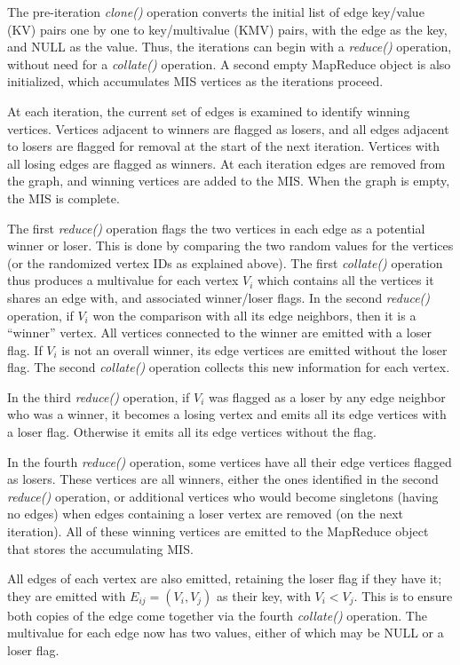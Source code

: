 The pre-iteration {\it clone()} operation converts the initial list of
edge key/value (KV) pairs one by one to key/multivalue (KMV) pairs,
with the edge as the key, and NULL as the value.  Thus, the iterations
can begin with a {\it reduce()} operation, without need for a {\it
collate()} operation.  A second empty MapReduce object is also
initialized, which accumulates MIS vertices as the iterations proceed.

At each iteration, the current set of edges is examined to identify
winning vertices.  Vertices adjacent to winners are flagged as losers,
and all edges adjacent to losers are flagged for removal at the start
of the next iteration.  Vertices with all losing edges are flagged as
winners.  At each iteration edges are removed from the graph, and
winning vertices are added to the MIS.  When the graph is empty, the
MIS is complete.

The first {\it reduce()} operation flags the two vertices in each edge as a
potential winner or loser.  This is done by comparing the two random
values for the vertices (or the randomized vertex IDs as explained
above).  The first {\it collate()} operation thus produces a multivalue for
each vertex $V_i$ which contains all the vertices it shares an edge
with, and associated winner/loser flags.  In the second {\it reduce()}
operation, if $V_i$ won the comparison with all its edge neighbors,
then it is a ``winner'' vertex.  All vertices connected to the winner
are emitted with a loser flag.  If $V_i$ is not an overall winner, its
edge vertices are emitted without the loser flag.  The second
{\it collate()} operation collects this new information for each vertex.

In the third {\it reduce()} operation, if $V_i$ was flagged as a loser by
any edge neighbor who was a winner, it becomes a losing vertex
and emits all its edge vertices with a loser flag.  Otherwise it emits
all its edge vertices without the flag.

In the fourth {\it reduce()} operation, some vertices have all their
edge vertices flagged as losers.  These vertices are all winners,
either the ones identified in the second {\it reduce()} operation, or
additional vertices who would become singletons (having no edges) when
edges containing a loser vertex are removed (on the next iteration).
All of these winning vertices are emitted to the MapReduce object that
stores the accumulating MIS.

All edges of each vertex are also emitted, retaining the loser flag if
they have it; they are emitted with $E_{ij} = (V_i, V_j)$ as their
key, with $V_i < V_j$.  This is to ensure both copies of the edge come
together via the fourth {\it collate()} operation.  The multivalue for
each edge now has two values, either of which may be NULL or a loser
flag.

